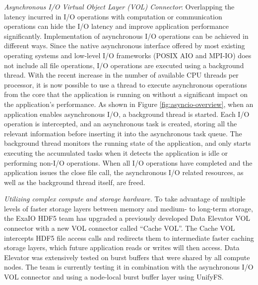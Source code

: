 \textit{Asynchronous I/O Virtual Object Layer (VOL) Connector}: Overlapping the latency incurred in I/O operations with computation or communication operations can hide the I/O latency and improve application performance significantly. Implementation of asynchronous I/O operations can be achieved in different ways. Since the native asynchronous interface offered by most existing operating systems and low-level I/O frameworks (POSIX AIO and MPI-IO) does not include all file operations, I/O operations are executed using a background thread. With the recent increase in the number of available CPU threads per processor, it is now possible to use a thread to execute asynchronous operations from the core that the application is running on without a significant impact on the application's performance. As shown in Figure \ref{fig:asyncio-overview}, when an application enables asynchronous I/O, a background thread is started. Each I/O operation is intercepted, and an asynchronous task is created, storing all the relevant information before inserting it into the asynchronous task queue. The background thread monitors the running state of the application, and only starts executing the accumulated tasks when it detects the application is idle or performing non-I/O operations. When all I/O operations have completed and the application issues the close file call, the asynchronous I/O related resources, as well as the background thread itself, are freed.

\textit{Utilizing complex compute and storage hardware. } 
To take advantage of multiple levels of faster storage layers between memory and medium- to long-term storage, the ExaIO HDF5 team has upgraded a previously developed Data Elevator VOL connector with a new VOL connector called ``Cache VOL''. The Cache VOL intercepts HDF5 file access calls and redirects them to intermediate faster caching storage layers, which future application reads or writes will then access. Data Elevator was extensively tested on burst buffers that were shared by all compute nodes. The team is currently testing it in combination with the asynchronous I/O VOL connector and using a node-local burst buffer layer using UnifyFS. 


